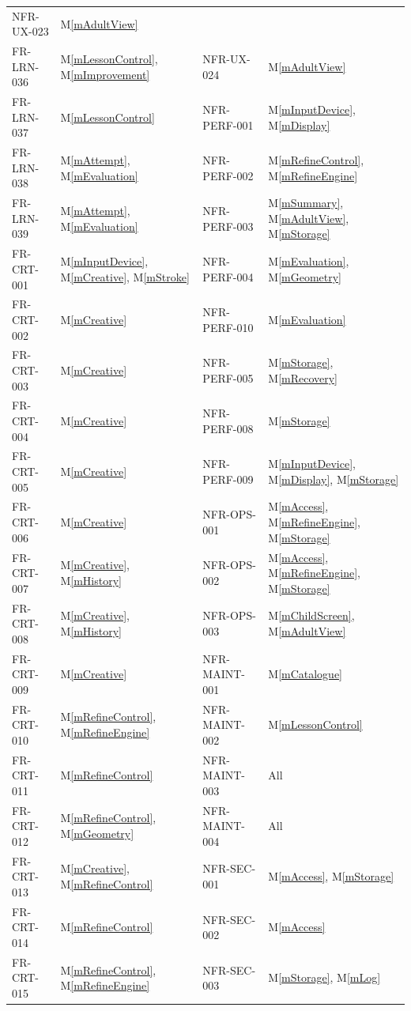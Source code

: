\documentclass[12pt, titlepage]{article}
\newcommand{\mref}[1]{M\ref{#1}}
\begin{document}
{\begin{longtable}{@{}p{} p{} p{}
p{}@{}}
  NFR-UX-023 & \mref{mAdultView}\\
FR-LRN-036 & \mref{mLessonControl}, \mref{mImprovement} &
  NFR-UX-024 & \mref{mAdultView}\\
FR-LRN-037 & \mref{mLessonControl} &
  NFR-PERF-001 & \mref{mInputDevice}, \mref{mDisplay}\\
FR-LRN-038 & \mref{mAttempt}, \mref{mEvaluation} &
  NFR-PERF-002 & \mref{mRefineControl}, \mref{mRefineEngine}\\
FR-LRN-039 & \mref{mAttempt}, \mref{mEvaluation} &
  NFR-PERF-003 & \mref{mSummary}, \mref{mAdultView}, \mref{mStorage}\\
FR-CRT-001 & \mref{mInputDevice}, \mref{mCreative}, \mref{mStroke} &
  NFR-PERF-004 & \mref{mEvaluation}, \mref{mGeometry}\\
FR-CRT-002 & \mref{mCreative} &
  NFR-PERF-010 & \mref{mEvaluation}\\
FR-CRT-003 & \mref{mCreative} &
  NFR-PERF-005 & \mref{mStorage}, \mref{mRecovery}\\
FR-CRT-004 & \mref{mCreative} &
  NFR-PERF-008 & \mref{mStorage}\\
FR-CRT-005 & \mref{mCreative} &
  NFR-PERF-009 & \mref{mInputDevice}, \mref{mDisplay}, \mref{mStorage}\\
FR-CRT-006 & \mref{mCreative} &
  NFR-OPS-001 & \mref{mAccess}, \mref{mRefineEngine}, \mref{mStorage}\\
FR-CRT-007 & \mref{mCreative}, \mref{mHistory} &
  NFR-OPS-002 & \mref{mAccess}, \mref{mRefineEngine}, \mref{mStorage}\\
FR-CRT-008 & \mref{mCreative}, \mref{mHistory} &
  NFR-OPS-003 & \mref{mChildScreen}, \mref{mAdultView}\\
FR-CRT-009 & \mref{mCreative} &
  NFR-MAINT-001 & \mref{mCatalogue}\\
FR-CRT-010 & \mref{mRefineControl}, \mref{mRefineEngine} &
  NFR-MAINT-002 & \mref{mLessonControl}\\
FR-CRT-011 & \mref{mRefineControl} &
  NFR-MAINT-003 & All\\
FR-CRT-012 & \mref{mRefineControl}, \mref{mGeometry} &
  NFR-MAINT-004 & All\\
FR-CRT-013 & \mref{mCreative}, \mref{mRefineControl} &
  NFR-SEC-001 & \mref{mAccess}, \mref{mStorage}\\
FR-CRT-014 & \mref{mRefineControl} &
  NFR-SEC-002 & \mref{mAccess}\\
FR-CRT-015 & \mref{mRefineControl}, \mref{mRefineEngine} &
  NFR-SEC-003 & \mref{mStorage}, \mref{mLog}\\

\end{longtable}}
\end{document}
